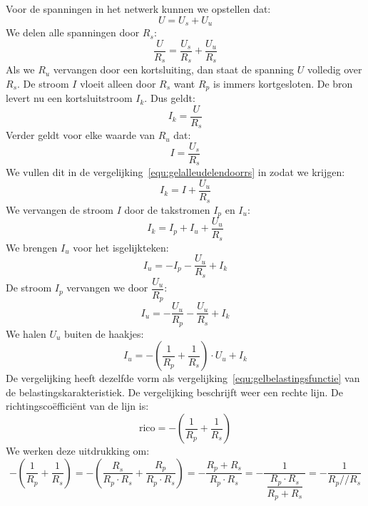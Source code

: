 Voor de spanningen in het netwerk kunnen we opstellen dat:
%
\begin{equation}
U = U_s + U_u
\end{equation}
%
We delen alle spanningen door $R_s$:
%
\begin{equation}
\label{equ:gelalleudelendoorrs}
\dfrac{U}{R_s} = \dfrac{U_s}{R_s} + \dfrac{U_u}{R_s}
\end{equation}
%
Als we $R_u$ vervangen door een kortsluiting, dan staat de spanning $U$ volledig over $R_s$. De stroom $I$ 
vloeit alleen door $R_s$ want $R_p$ is immers kortgesloten. De bron levert nu een kortsluitstroom $I_k$.
Dus geldt:
%
\begin{equation}
\label{equ:theveninkortsluitstroom}
I_k = \dfrac{U}{R_s}
\end{equation}
%
Verder geldt voor elke waarde van $R_u$ dat:
\begin{equation}
I = \dfrac{U_s}{R_s}
\end{equation}
%
We vullen dit in de vergelijking~\eqref{equ:gelalleudelendoorrs} in zodat we krijgen:
% 
\begin{equation}
I_k = I + \dfrac{U_u}{R_s}
\end{equation}
%
We vervangen de stroom $I$ door de takstromen $I_p$ en $I_u$:
%
\begin{equation}
I_k = I_p + I_u + \dfrac{U_u}{R_s}
\end{equation}
%
We brengen $I_u$ voor het isgelijkteken:
%
\begin{equation}
I_u = -I_p - \dfrac{U_u}{R_s} + I_k
\end{equation}
%
De stroom $I_p$ vervangen we door $\dfrac{U_u}{R_p}$:
%
\begin{equation}
I_u = -\dfrac{U_u}{R_p} - \dfrac{U_u}{R_s} + I_k
\end{equation}
%
We halen $U_u$ buiten de haakjes:
%
\begin{equation}
I_u = - \left(\dfrac{1}{R_p}+\dfrac{1}{R_s}\right)\cdot U_u + I_k
\end{equation}
%
De vergelijking heeft dezelfde vorm als vergelijking~\eqref{equ:gelbelastingsfunctie} van de belastingskarakteristiek.
De vergelijking beschrijft weer een rechte lijn. De richtingsco\"effici\"ent van de lijn is:
%
\begin{equation}
\text{rico} = - \left(\dfrac{1}{R_p}+\dfrac{1}{R_s}\right)
\end{equation}
%
We werken deze uitdrukking om:
%
\begin{equation}
- \left(\dfrac{1}{R_p}+\dfrac{1}{R_s}\right) = - \left(\dfrac{R_s}{R_p\cdot R_s}+\dfrac{R_p}{R_p\cdot R_s}\right) =
-\dfrac{R_p+R_s}{R_p\cdot R_s} = - \dfrac{1}{\ \dfrac{R_p\cdot R_s}{R_p+R_s}\ } = -\dfrac{1}{R_p // R_s}
\end{equation}
